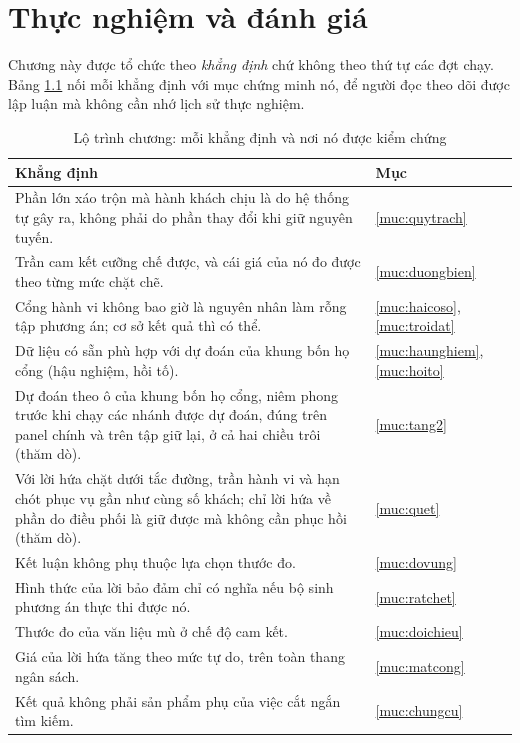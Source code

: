 \chapter{Thực nghiệm và đánh giá}

Chương này được tổ chức theo \emph{khẳng định} chứ không theo thứ tự các đợt chạy. Bảng
\ref{bang:lotrinh} nối mỗi khẳng định với mục chứng minh nó, để người đọc theo dõi được lập
luận mà không cần nhớ lịch sử thực nghiệm.

\begin{table}[htbp]
\centering
\caption{Lộ trình chương: mỗi khẳng định và nơi nó được kiểm chứng}
\label{bang:lotrinh}
\small
\begin{tabular}{@{}p{9.6cm}l@{}}
\toprule
\textbf{Khẳng định} & \textbf{Mục}\\
\midrule
Phần lớn xáo trộn mà hành khách chịu là do hệ thống tự gây ra, không phải do phần thay đổi khi
giữ nguyên tuyến. & \ref{muc:quytrach}\\
Trần cam kết cưỡng chế được, và cái giá của nó đo được theo từng mức chặt chẽ. &
\ref{muc:duongbien}\\
Cổng hành vi không bao giờ là nguyên nhân làm rỗng tập phương án; cơ sở kết quả thì có thể. &
\ref{muc:haicoso}, \ref{muc:troidat}\\
Dữ liệu có sẵn phù hợp với dự đoán của khung bốn họ cổng (hậu nghiệm, hồi tố). &
\ref{muc:haunghiem}, \ref{muc:hoito}\\
Dự đoán theo ô của khung bốn họ cổng, niêm phong trước khi chạy các nhánh được dự đoán, đúng trên
panel chính và trên tập
giữ lại, ở cả hai chiều trôi (thăm dò). & \ref{muc:tang2}\\
Với lời hứa chặt dưới tắc đường, trần hành vi và hạn chót phục vụ gần như cùng số khách; chỉ lời hứa
về phần do điều phối là giữ được mà không cần phục hồi (thăm dò). & \ref{muc:quet}\\
Kết luận không phụ thuộc lựa chọn thước đo. & \ref{muc:dovung}\\
Hình thức của lời bảo đảm chỉ có nghĩa nếu bộ sinh phương án thực thi được nó. & \ref{muc:ratchet}\\
Thước đo của văn liệu mù ở chế độ cam kết. & \ref{muc:doichieu}\\
Giá của lời hứa tăng theo mức tự do, trên toàn thang ngân sách. & \ref{muc:matcong}\\
Kết quả không phải sản phẩm phụ của việc cắt ngắn tìm kiếm. & \ref{muc:chungcu}\\
\bottomrule
\end{tabular}
\end{table}

